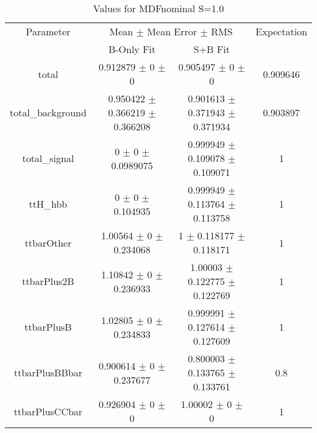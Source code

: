 \begin{table}
\centering
\caption{Values for MDFnominal S=1.0}
\begin{tabular}{cccc}
\toprule
Parameter & \multicolumn{2}{c}{Mean $\pm$ Mean Error $\pm$ RMS} & Expectation\\
 & B-Only Fit & S+B Fit & \\
\midrule
total & \num{0.912879} $\pm$ \num{0} $\pm$ \num{0} & \num{0.905497} $\pm$ \num{0} $\pm$ \num{0} & \num{0.909646}\\
total\_background & \num{0.950422} $\pm$ \num{0.366219} $\pm$ \num{0.366208} & \num{0.901613} $\pm$ \num{0.371943} $\pm$ \num{0.371934} & \num{0.903897}\\
total\_signal & \num{0} $\pm$ \num{0} $\pm$ \num{0.0989075} & \num{0.999949} $\pm$ \num{0.109078} $\pm$ \num{0.109071} & \num{1}\\
ttH\_hbb & \num{0} $\pm$ \num{0} $\pm$ \num{0.104935} & \num{0.999949} $\pm$ \num{0.113764} $\pm$ \num{0.113758} & \num{1}\\
ttbarOther & \num{1.00564} $\pm$ \num{0} $\pm$ \num{0.234068} & \num{1} $\pm$ \num{0.118177} $\pm$ \num{0.118171} & \num{1}\\
ttbarPlus2B & \num{1.10842} $\pm$ \num{0} $\pm$ \num{0.236933} & \num{1.00003} $\pm$ \num{0.122775} $\pm$ \num{0.122769} & \num{1}\\
ttbarPlusB & \num{1.02805} $\pm$ \num{0} $\pm$ \num{0.234833} & \num{0.999991} $\pm$ \num{0.127614} $\pm$ \num{0.127609} & \num{1}\\
ttbarPlusBBbar & \num{0.900614} $\pm$ \num{0} $\pm$ \num{0.237677} & \num{0.800003} $\pm$ \num{0.133765} $\pm$ \num{0.133761} & \num{0.8}\\
ttbarPlusCCbar & \num{0.926904} $\pm$ \num{0} $\pm$ \num{0} & \num{1.00002} $\pm$ \num{0} $\pm$ \num{0} & \num{1}\\
\bottomrule
\end{tabular}
\end{table}